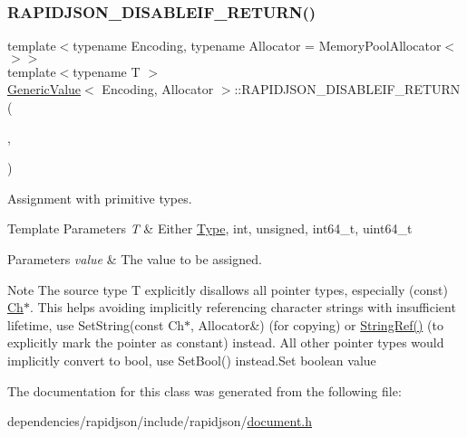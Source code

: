 \subsubsection{\texorpdfstring{R\+A\+P\+I\+D\+J\+S\+O\+N\+\_\+\+D\+I\+S\+A\+B\+L\+E\+I\+F\+\_\+\+R\+E\+T\+U\+R\+N()}{RAPIDJSON\_DISABLEIF\_RETURN()}}
{\footnotesize\ttfamily template$<$typename Encoding, typename Allocator = Memory\+Pool\+Allocator$<$$>$$>$ \\
template$<$typename T $>$ \\
\hyperlink{class_generic_value}{Generic\+Value}$<$ Encoding, Allocator $>$\+::R\+A\+P\+I\+D\+J\+S\+O\+N\+\_\+\+D\+I\+S\+A\+B\+L\+E\+I\+F\+\_\+\+R\+E\+T\+U\+RN (\begin{DoxyParamCaption}\item[{(internal\+::\+Is\+Pointer$<$ T $>$)}]{,  }\item[{(\hyperlink{class_generic_value}{Generic\+Value}$<$ Encoding, Allocator $>$ \&)}]{ }\end{DoxyParamCaption})}



Assignment with primitive types. 


\begin{DoxyTemplParams}{Template Parameters}
{\em T} & Either \hyperlink{rapidjson_8h_a1d1cfd8ffb84e947f82999c682b666a7}{Type}, {\ttfamily int}, {\ttfamily unsigned}, {\ttfamily int64\+\_\+t}, {\ttfamily uint64\+\_\+t} \\
\hline
\end{DoxyTemplParams}

\begin{DoxyParams}{Parameters}
{\em value} & The value to be assigned.\\
\hline
\end{DoxyParams}
\begin{DoxyNote}{Note}
The source type {\ttfamily T} explicitly disallows all pointer types, especially ({\ttfamily const}) \hyperlink{class_generic_value_ade0e0ce64ccd5d852da57a35e720bafb}{Ch}$\ast$. This helps avoiding implicitly referencing character strings with insufficient lifetime, use Set\+String(const Ch$\ast$, Allocator\&) (for copying) or \hyperlink{document_8h_aa6b9fd9f6aa49405a574c362ba9af6b5}{String\+Ref()} (to explicitly mark the pointer as constant) instead. All other pointer types would implicitly convert to {\ttfamily bool}, use Set\+Bool() instead.\+Set boolean value 
\end{DoxyNote}


The documentation for this class was generated from the following file\+:\begin{DoxyCompactItemize}
\item 
dependencies/rapidjson/include/rapidjson/\hyperlink{document_8h}{document.\+h}\end{DoxyCompactItemize}
